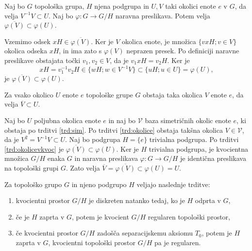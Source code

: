 \documentclass[mat1]{fmfdelo}
\newcommand{\closure}[1]{\overline{#1}}
\begin{document}
\begin{trditev}\label{trd:okolicevkvoc}
Naj bo $G$ topološka grupa, $H$ njena podgrupa in $U, V$ taki okolici enote $e$ v $G$, da velja $V^{-1}V \subset U$. Naj bo $\varphi: G \to G/H$ naravna preslikava. Potem velja $\closure{\varphi(V)} \subset \varphi(U)$.
\end{trditev}

\begin{dokaz}
Vzemimo odsek $xH \in \closure{\varphi(V)}$. Ker je $V$ okolica enote, je množica $\lbrace vxH ; v \in V \rbrace$ okolica odseka $xH$, in ima zato s $\varphi(V)$ neprazen presek. Po definiciji naravne preslikave obstajata točki $v_1, v_2 \in V$, da je $v_1xH = v_2H$. Ker je \[xH = v_1^{-1}v_2H \in \lbrace wH ; w \in V^{-1}V \rbrace \subset \lbrace uH ; u \in U \rbrace = \varphi(U), \]
je $\closure{\varphi(V)} \subset \varphi(U)$.
\end{dokaz}

\begin{posledica}\label{pos:sim}
Za vsako okolico $U$ enote $e$ topološke grupe $G$ obstaja taka okolica $V$ enote $e$, da velja $\closure{V} \subset U$.
\end{posledica}

\begin{dokaz}
Naj bo $U$ poljubna okolica enote $e$ in naj bo $\mathcal{V}$ baza simetričnih okolic enote $e$, ki obstaja po trditvi \ref{trd:sim}. Po trditvi \ref{trd:okolice} obstaja takšna okolica $V \in \mathcal{V}$, da je $V^2 = V^{-1}V \subset U$. Naj bo podgrupa $H = \lbrace e \rbrace$ trivialna podgrupa. Po trditvi \ref{trd:okolicevkvoc} je $\closure{\varphi(V)} \subset \varphi(U)$. Ker je $H$ trivialna podgrupa, je kvocientna množica $G/H$ enaka $G$ in naravna preslikava $\varphi\colon G \to G/H$ je identična preslikava na topološki grupi $G$. Zato velja $\closure{V} = \closure{\varphi(V)} \subset \varphi(U) = U$.
\end{dokaz}

\begin{izrek}\label{izr:kvocreg}
Za topološko grupo $G$ in njeno podgrupo $H$ veljajo naslednje trditve:
\begin{enumerate}
\item kvocientni prostor $G/H$ je diskreten natanko tedaj, ko je $H$ odprta v $G$,\label{podtrd:kvocreg1}
\item če je $H$ zaprta v $G$, potem je kvocient $G/H$ regularen topološki prostor,\label{podtrd:kvocreg2}
\item če kvocientni prostor $G/H$ zadošča separacijskemu aksiomu $T_0$, potem je $H$ zaprta v $G$, kvocientni topološki prostor $G/H$ pa je regularen.\label{podtrd:kvocreg3}
\end{enumerate}
\end{izrek}
\end{document}
